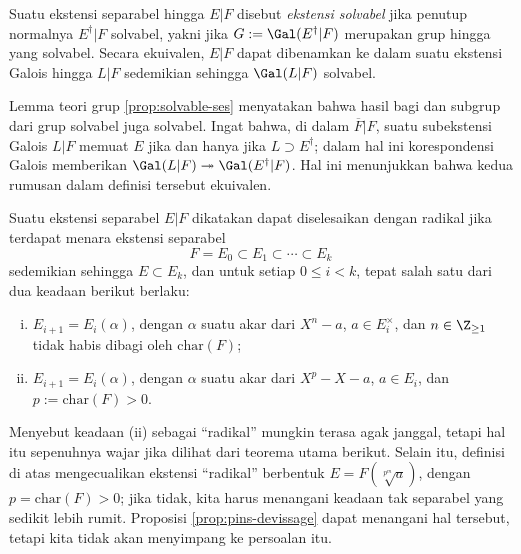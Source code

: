 \begin{definition}
	Suatu ekstensi separabel hingga $E|F$ disebut \emph{ekstensi solvabel} jika penutup normalnya $E^\dagger|F$ solvabel, yakni jika $G := \Gal(E^\dagger|F)$ merupakan grup hingga yang solvabel. Secara ekuivalen, $E|F$ dapat dibenamkan ke dalam suatu ekstensi Galois hingga $L|F$ sedemikian sehingga $\Gal(L|F)$ solvabel.
\end{definition}
Lemma teori grup \ref{prop:solvable-ses} menyatakan bahwa hasil bagi dan subgrup dari grup solvabel juga solvabel. Ingat bahwa, di dalam $\overline{F}|F$, suatu subekstensi Galois $L|F$ memuat $E$ jika dan hanya jika $L \supset E^\dagger$; dalam hal ini korespondensi Galois memberikan $\Gal(L|F) \twoheadrightarrow \Gal(E^\dagger|F)$. Hal ini menunjukkan bahwa kedua rumusan dalam definisi tersebut ekuivalen.

\begin{definition}\label{def:radical-ext}
	Suatu ekstensi separabel $E|F$ dikatakan dapat diselesaikan dengan radikal jika terdapat menara ekstensi separabel
	\[ F = E_0 \subset E_1 \subset \cdots \subset E_k \]
	sedemikian sehingga $E \subset E_k$, dan untuk setiap $0 \leq i < k$, tepat salah satu dari dua keadaan berikut berlaku:
	\begin{enumerate}[(i)]
		\item $E_{i+1} = E_i(\alpha)$, dengan $\alpha$ suatu akar dari $X^n - a$, $a \in E_i^\times$, dan $n \in \Z_{\geq 1}$ tidak habis dibagi oleh $\text{char}(F)$;
		\item $E_{i+1} = E_i(\alpha)$, dengan $\alpha$ suatu akar dari $X^p- X - a$, $a \in E_i$, dan $p := \text{char}(F) > 0$.
	\end{enumerate}
\end{definition}
Menyebut keadaan (ii) sebagai ``radikal'' mungkin terasa agak janggal, tetapi hal itu sepenuhnya wajar jika dilihat dari teorema utama berikut. Selain itu, definisi di atas mengecualikan ekstensi ``radikal'' berbentuk $E = F(\sqrt[p^m]{a})$, dengan $p = \text{char}(F) > 0$; jika tidak, kita harus menangani keadaan tak separabel yang sedikit lebih rumit. Proposisi \ref{prop:pins-devissage} dapat menangani hal tersebut, tetapi kita tidak akan menyimpang ke persoalan itu.


